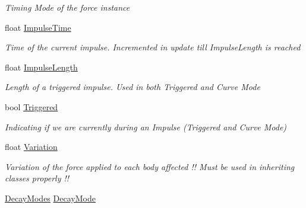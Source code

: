 \begin{DoxyCompactItemize}
\begin{DoxyCompactList}\small\item\em Timing Mode of the force instance \end{DoxyCompactList}\item 
float \hyperlink{class_farseer_physics_1_1_controllers_1_1_abstract_force_controller_a50412a793360702bac2c5653c5730d14}{Impulse\+Time}
\begin{DoxyCompactList}\small\item\em Time of the current impulse. Incremented in update till Impulse\+Length is reached \end{DoxyCompactList}\item 
float \hyperlink{class_farseer_physics_1_1_controllers_1_1_abstract_force_controller_a77baf680be1aa753075cd59d419edfba}{Impulse\+Length}
\begin{DoxyCompactList}\small\item\em Length of a triggered impulse. Used in both Triggered and Curve Mode \end{DoxyCompactList}\item 
bool \hyperlink{class_farseer_physics_1_1_controllers_1_1_abstract_force_controller_a9c7e70cd8c1d2c48d265e81240e2b95b}{Triggered}
\begin{DoxyCompactList}\small\item\em Indicating if we are currently during an Impulse (Triggered and Curve Mode) \end{DoxyCompactList}\item 
float \hyperlink{class_farseer_physics_1_1_controllers_1_1_abstract_force_controller_a57ebfe526add8959ba2e4e2ef586b829}{Variation}
\begin{DoxyCompactList}\small\item\em Variation of the force applied to each body affected !! Must be used in inheriting classes properly !! \end{DoxyCompactList}\item 
\hyperlink{class_farseer_physics_1_1_controllers_1_1_abstract_force_controller_aa49b5aa364a7f2f8a51af67437adabe0}{Decay\+Modes} \hyperlink{class_farseer_physics_1_1_controllers_1_1_abstract_force_controller_a10a51f44dd3d177b9a6c61d5bede2b74}{Decay\+Mode}

\end{DoxyCompactItemize}
